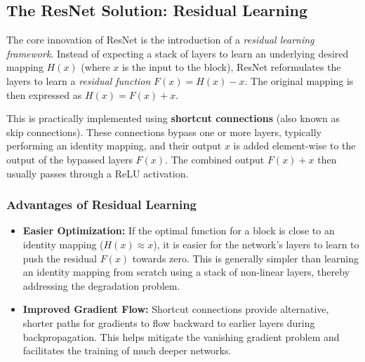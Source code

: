 \documentclass[11pt, a4paper]{article}
\begin{document}
\subsection{The ResNet Solution: Residual Learning}
The core innovation of ResNet is the introduction of a \textit{residual learning framework}. Instead of expecting a stack of layers to learn an underlying desired mapping $H(x)$ (where $x$ is the input to the block), ResNet reformulates the layers to learn a \textit{residual function} $F(x) = H(x) - x$. The original mapping is then expressed as $H(x) = F(x) + x$.

This is practically implemented using \textbf{shortcut connections} (also known as skip connections). These connections bypass one or more layers, typically performing an identity mapping, and their output $x$ is added element-wise to the output of the bypassed layers $F(x)$. The combined output $F(x)+x$ then usually passes through a ReLU activation.

\subsubsection{Advantages of Residual Learning}
\begin{itemize}[itemsep=0.5em]
    \item \textbf{Easier Optimization:} If the optimal function for a block is close to an identity mapping ($H(x) \approx x$), it is easier for the network's layers to learn to push the residual $F(x)$ towards zero. This is generally simpler than learning an identity mapping from scratch using a stack of non-linear layers, thereby addressing the degradation problem.
    \item \textbf{Improved Gradient Flow:} Shortcut connections provide alternative, shorter paths for gradients to flow backward to earlier layers during backpropagation. This helps mitigate the vanishing gradient problem and facilitates the training of much deeper networks.
\end{itemize}
\end{document}
